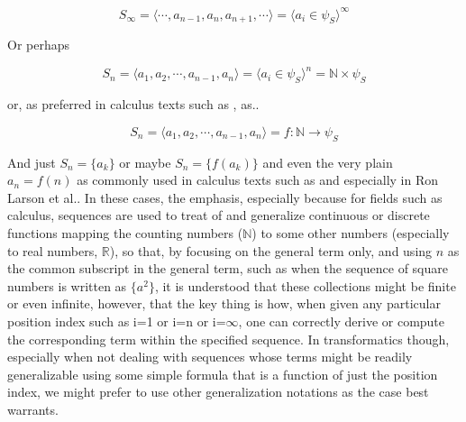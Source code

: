 \documentclass[a4paper, 18pt]{book} %
\begin{document}
\begin{appendices}
\vspace{2em}

\begin{equation}
S_\infty = \langle \cdots, a_{n-1}, a_n, a_{n+1}, \cdots \rangle = \langle a_i \in \psi_S \rangle^\infty
\end{equation} 

\vspace{2em}

Or perhaps

\vspace{2em}

\begin{equation}
S_n = \langle a_1, a_2, \cdots, a_{n-1}, a_n \rangle = \langle a_i \in \psi_S \rangle^n = \mathbb{N} \times \psi_S
\end{equation} 

\vspace{2em}

or, as preferred in calculus texts such as \cite{fitzpatrick1995advanced}, as..


\vspace{2em}

\begin{equation}
S_n = \langle a_1, a_2, \cdots, a_{n-1}, a_n \rangle = f: \mathbb{N} \rightarrow \psi_S
\end{equation} 

\vspace{2em}

And just $S_n = \{a_k\}$ or maybe $S_n = \{f(a_k)\}$  and even the very plain $a_n = f(n)$ as commonly used in calculus texts such as \cite{fitzpatrick1995advanced} and especially in Ron Larson et al.\cite{ronlarsoncalculus}. In these cases, the emphasis, especially because for fields such as calculus, sequences are used to treat of and generalize continuous or discrete functions mapping the counting numbers ($\mathbb{N}$) to some other numbers (especially to real numbers, $\mathbb{R}$), so that, by focusing on the general term only, and using $n$ as the common subscript in the general term, such as when the sequence of square numbers is written as $\{a^2\}$, it is understood that these collections might be finite or even infinite, however, that the key thing is how, when given any particular position index such as i=1 or i=n or i=$\infty$, one can correctly derive or compute the corresponding term within the specified sequence. In transformatics though, especially when not dealing with sequences whose terms might be readily generalizable using some simple formula that is a function of just the position index, we might prefer to use other generalization notations as the case best warrants.


\end{appendices}
\end{document}
